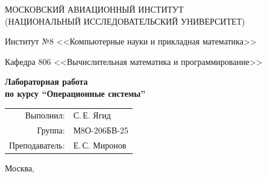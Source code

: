 \begin{titlepage}
\begin{center}
\large
МОСКОВСКИЙ АВИАЦИОННЫЙ ИНСТИТУТ\\ (НАЦИОНАЛЬНЫЙ ИССЛЕДОВАТЕЛЬСКИЙ УНИВЕРСИТЕТ)

\vspace{20pt}

Институт №8 <<Компьютерные науки и прикладная математика>>

Кафедра 806 <<Вычислительная математика и программирование>>
\end{center}

\vspace{60pt}

\begin{center}
\bfseries
\large
Лабораторная работа  \\по курсу \enquote{Операционные системы}

\vspace{54pt}

\end{center}

\vfill

\begin{flushright}
\large
\begin{tabular}{rl}
Выполнил: & С.\,Е. Ягид \\
Группа: & М8О-206БВ-25 \\
Преподаватель: & Е.\,С. Миронов \\
\end{tabular}
\end{flushright}

\vspace{92pt}

\begin{center}
\large
Москва, \the\year
\end{center}
\end{titlepage}

\pagebreak
